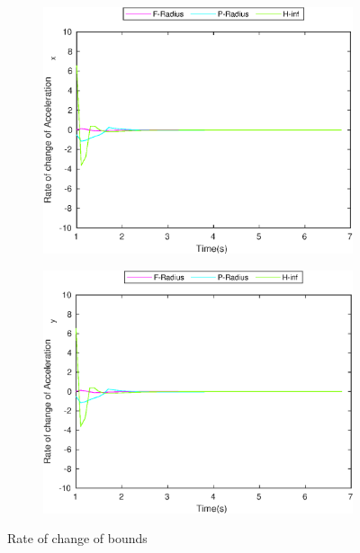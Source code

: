 \begin{figure}[!h]
\begin{subfigure}{.5\linewidth}
\includegraphics[width=.9\linewidth]{figures/BoundChange/CS/cs_bound_changeAcceleration_x}
\end{subfigure}
\begin{subfigure}{.5\linewidth}
\centering
\includegraphics[width=.9\linewidth]{figures/BoundChange/CS/cs_bound_changeAcceleration_y}
\end{subfigure}
\caption{Rate of change of bounds}
\end{figure}